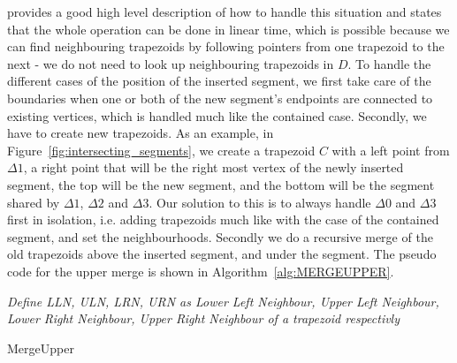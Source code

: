 \cite{computational_geometry} provides a good high level description of how to handle this situation and states that the whole operation can be done in linear time, which is possible because we can find neighbouring trapezoids by following pointers from one trapezoid to the next  - we do not need to look up neighbouring trapezoids in $D$. To handle the different cases of the position of the inserted segment, we first take care of the boundaries when one or both of the new segment's endpoints are connected to existing vertices, which is handled much like the contained case. Secondly, we have to create new trapezoids. As an example, in Figure~\ref{fig:intersecting_segments}, we create a  trapezoid $C$ with a left point from $\Delta 1$, a right point that will be the right most vertex of the newly inserted segment, the top will be the new segment, and the bottom will be the segment shared by  $\Delta 1$,  $\Delta 2$ and  $\Delta 3$.  Our solution to this is to always handle $\Delta 0$ and $\Delta 3$ first in isolation, i.e. adding trapezoids much like with the case of the contained segment, and set the neighbourhoods. Secondly we do a recursive merge of the old trapezoids above the inserted segment, and under the segment. The pseudo code for the upper merge is shown in Algorithm~\ref{alg:MERGEUPPER}.


\IncMargin{1em}
\begin{algorithm}[]
\label{alg:MERGEUPPER}
 \emph{Define LLN, ULN, LRN, URN as Lower Left Neighbour, Upper Left Neighbour, Lower Right Neighbour, Upper Right Neighbour of a trapezoid respectivly}\;
\caption{MergeUpper}\label{algo_disjdecomp}
\end{algorithm}\DecMargin{1em}

